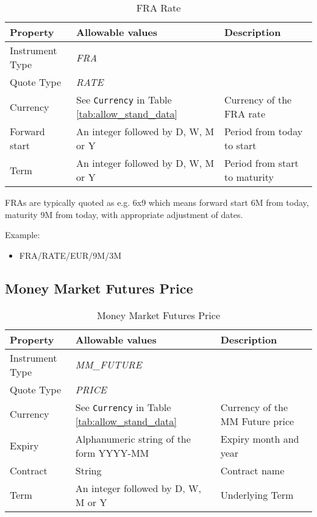 \begin{table}[H]
\centering
  \begin{tabular}{|p{3cm}|p{3.5cm}|p{7cm}|}
  \hline
    {\bf Property} & {\bf Allowable values} & {\bf Description} \\ \hline
    Instrument Type & \emph{FRA} & \\ \hline
    Quote Type & \emph{RATE} & \\ \hline
    Currency & See \lstinline!Currency! in Table \ref{tab:allow_stand_data} & Currency of the FRA rate\\ \hline
    Forward start & An integer followed by D, W, M or Y  & Period from today to start \\ \hline
    Term & An integer followed by D, W, M or Y & Period from start to maturity\\ \hline
  \end{tabular}
  \caption{FRA Rate}
  \label{tab:fra_quote}
\end{table}

FRAs are typically quoted as e.g. 6x9 which means forward start 6M from today, maturity 9M from today, with appropriate
adjustment of dates.

\medskip
Example:
\begin{itemize}
\item {FRA/RATE/EUR/9M/3M}
\end{itemize}

\subsection{Money Market Futures Price}

\begin{table}[H]
\centering
  \begin{tabular}{|p{3cm}|p{4.5cm}|p{7cm}|}
  \hline
    {\bf Property} & {\bf Allowable values} & {\bf Description} \\ \hline
    Instrument Type & \emph{MM\_FUTURE} & \\ \hline
    Quote Type & \emph{PRICE} & \\ \hline
    Currency & See \lstinline!Currency! in Table \ref{tab:allow_stand_data}& Currency of the MM Future price\\ \hline
    Expiry & Alphanumeric string of the form YYYY-MM & Expiry month and year\\ \hline
    Contract & String & Contract name\\ \hline
    Term & An integer followed by D, W, M or Y & Underlying Term\\ \hline
  \end{tabular}
  \caption{Money Market Futures Price}
  \label{tab:mmfp_quote}
\end{table}

